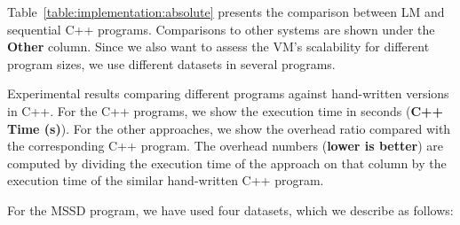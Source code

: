 Table~\ref{table:implementation:absolute} presents the comparison between LM and
sequential C++ programs. Comparisons to other systems are shown under the
\textbf{Other} column. Since we also want to assess the VM's scalability for
different program sizes, we use different datasets in several programs.

\begin{table}[ht]
   \begin{center}
      
   \end{center}

   \caption{Experimental results comparing different programs against
      hand-written versions in C++. For the C++ programs, we show the execution
      time in seconds (\textbf{C++ Time (s)}). For the other approaches, we show
      the overhead ratio compared with the corresponding C++ program. The
      overhead numbers (\textbf{lower is better}) are computed by dividing the
   execution time of the approach on that column by the execution time of the
similar hand-written C++ program.}

   \label{table:implementation:absolute}
\end{table}

For the MSSD program, we have used four datasets, which we describe as follows:

